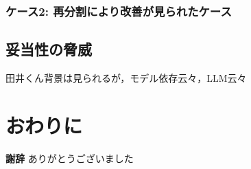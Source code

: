 \documentclass[submit,techrep,noauthor]{ipsj}
\begin{document}
\subsubsection{ケース2: 再分割により改善が見られたケース}


\subsection{妥当性の脅威}
田井くん背景は見られるが，モデル依存云々，LLM云々

\section{おわりに}
\label{sec:conclusion}

\textbf{謝辞} ありがとうございました



\end{document}
